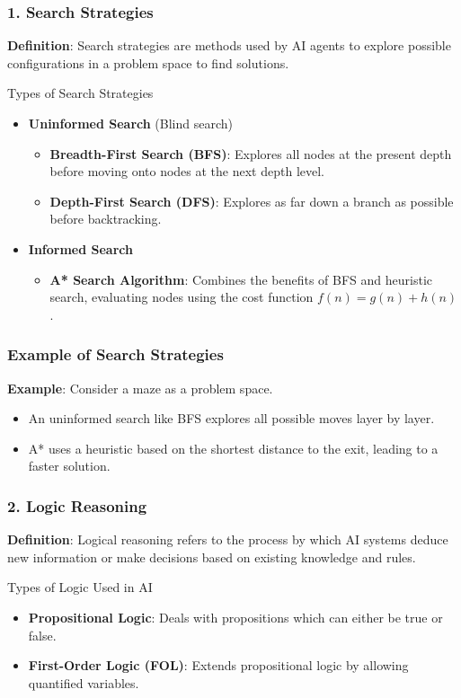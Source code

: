 \documentclass[aspectratio=169]{beamer}
\begin{document}
\begin{frame}[fragile]
    \frametitle{1. Search Strategies}
    \textbf{Definition}: Search strategies are methods used by AI agents to explore possible configurations in a problem space to find solutions.

    \begin{block}{Types of Search Strategies}
        \begin{itemize}
            \item \textbf{Uninformed Search} (Blind search)
            \begin{itemize}
                \item \textbf{Breadth-First Search (BFS)}: Explores all nodes at the present depth before moving onto nodes at the next depth level.
                \item \textbf{Depth-First Search (DFS)}: Explores as far down a branch as possible before backtracking.
            \end{itemize}
            \item \textbf{Informed Search}
            \begin{itemize}
                \item \textbf{A* Search Algorithm}: Combines the benefits of BFS and heuristic search, evaluating nodes using the cost function \(f(n) = g(n) + h(n)\).
            \end{itemize}
        \end{itemize}
    \end{block}
\end{frame}

\begin{frame}[fragile]
    \frametitle{Example of Search Strategies}
    \textbf{Example}: Consider a maze as a problem space.
    \begin{itemize}
        \item An uninformed search like BFS explores all possible moves layer by layer.
        \item A* uses a heuristic based on the shortest distance to the exit, leading to a faster solution.
    \end{itemize}
\end{frame}

\begin{frame}[fragile]
    \frametitle{2. Logic Reasoning}
    \textbf{Definition}: Logical reasoning refers to the process by which AI systems deduce new information or make decisions based on existing knowledge and rules.
    
    \begin{block}{Types of Logic Used in AI}
        \begin{itemize}
            \item \textbf{Propositional Logic}: Deals with propositions which can either be true or false.
            \item \textbf{First-Order Logic (FOL)}: Extends propositional logic by allowing quantified variables.
        \end{itemize}
    \end{block}
\end{frame}
\end{document}
